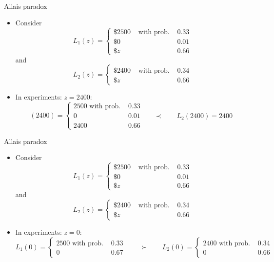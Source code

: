 \documentclass[11pt, aspectratio=169]{beamer}
\begin{document}
\begin{frame}[t]{Allais paradox}
\begin{itemize}
\item Consider\[L_1(z)=\left\{\begin{array}{lll}\$ 2500 & \text { with prob. } & 0.33\\ \$0 & & 0.01 \\ \$ z & & 0.66\end{array}\right.\]
and
\[L_2(z)=\left\{\begin{array}{lll}\$ 2400 & \text { with prob. } & 0.34 \\ \$ z & & 0.66\end{array}\right.\]\medskip
\item In experiments: $z=2400$:
\[(2400)= \begin{cases} 2500 \text { with prob. } & 0.33 \\  0 & 0.01 \qquad\prec \qquad L_2(2400)=2400\\  2400 & 0.66\end{cases}
\]
\end{itemize}
\end{frame}

\begin{frame}[t]{Allais paradox}
\begin{itemize}
\item Consider\[L_1(z)=\left\{\begin{array}{lll}\$ 2500 & \text { with prob. } & 0.33\\ \$0 & & 0.01 \\ \$ z & & 0.66\end{array}\right.\]
and
\[L_2(z)=\left\{\begin{array}{lll}\$ 2400 & \text { with prob. } & 0.34 \\ \$ z & & 0.66\end{array}\right.\]\medskip
\item In experiments: $z=0$:
\[L_1(0)= \begin{cases} 2500 \text { with prob. } & 0.33 \\ 0 & 0.67 \end{cases}\qquad \succ \qquad
L_2(0) = \begin{cases} 2400 \text { with prob. } & 0.34 \\ 0 & 0.66\end{cases}\]
\end{itemize}
\end{frame}
\end{document}
